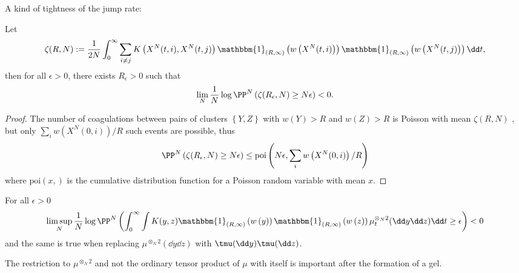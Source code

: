 A kind of tightness of the jump rate:
\begin{proposition}
Let
\begin{equation}
    \zeta(R,N) := \frac{1}{2N} \int_0^\infty \sum_{i \neq j}K\left(X^N(t,i), X^N(t,j)\right) 
      \mathbbm{1}_{(R,\infty)}\left(w\left(X^N(t,i)\right) \right)
      \mathbbm{1}_{(R,\infty)}\left(w\left(X^N(t,j)\right) \right) \dd t,
\end{equation}
then for all $\epsilon > 0$, there exists $R_\epsilon > 0$ such that
\begin{equation}
    \lim_N \frac1N \log \PP^N\left(\zeta(R_\epsilon,N) \geq N\epsilon \right) < 0.
\end{equation}
\end{proposition}
\begin{proof}
The number of coagulations between pairs of clusters $\left\{Y,Z\right\}$ with $w(Y)> R$ and $w(Z) > R$ is Poisson with mean $\zeta(R,N)$ , but only $\sum_i w\left(X^N(0,i)\right) / R$ such events are possible, thus
\begin{equation}
    \PP^N\left(\zeta(R_\epsilon,N) \geq N\epsilon \right)
    \leq
    \mathrm{poi}\left(N\epsilon,  \sum_i w\left(X^N(0,i)\right) / R\right)
\end{equation}
where $\mathrm{poi}(x, )$ is the cumulative distribution function for a Poisson random variable with mean $x$.
\end{proof}

\begin{corollary}
For all $\epsilon > 0$
\begin{equation}
\limsup_N \frac1N \log\PP^N\left(
\int_0^\infty \int K(y,z)\mathbbm{1}_{(R,\infty)}\left(w\left(y\right) \right)
      \mathbbm{1}_{(R,\infty)}\left(w\left(z\right) \right) \mu_t^{\otimes_N 2}(\dd y \dd z) \dd t
      \geq \epsilon \right) < 0
\end{equation}
and the same is true when replacing $\mu^{\otimes_N 2}(\dd y \dd z)$ with $\tmu(\dd y) \tmu(\dd z)$.
\end{corollary}
The restriction to $\mu^{\otimes_N 2}$ and not the ordinary tensor product of $\mu$ with itself is important after the formation of a gel.